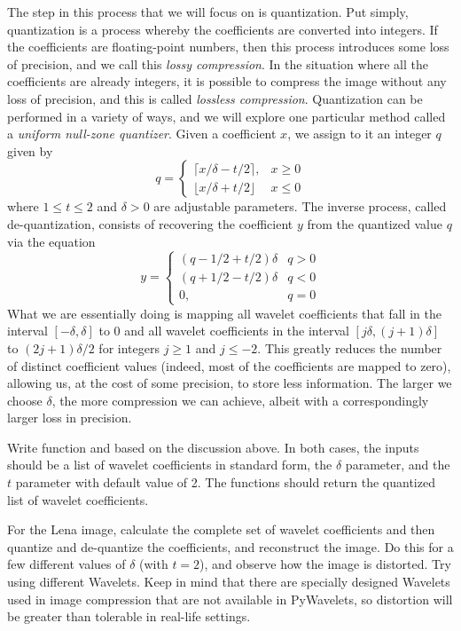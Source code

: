  The step in this process that we will focus on is quantization. Put simply,
 quantization is a process whereby the coefficients are converted into
 integers. If the coefficients are floating-point numbers, then this
 process introduces some loss of precision, and we call this \textit{
 lossy compression}. In the situation where all the coefficients are already
 integers, it is possible to compress the image without any loss of precision,
 and this is called \textit{lossless compression}. Quantization can be
 performed in a variety of ways, and we will explore one particular method
 called a \emph{uniform null-zone quantizer}. Given a coefficient $x$, we assign
 to it an integer $q$ given by
\begin{equation*}
q =
 \begin{cases}
   \lceil x / \delta - t/2 \rceil, &  x \geq 0\\
   \lfloor x / \delta + t/2 \rfloor & x \leq 0
 \end{cases}
\end{equation*}
where $1 \leq t \leq 2$ and $\delta > 0$ are adjustable parameters.
The inverse process, called de-quantization, consists of recovering
the coefficient $y$ from the quantized value $q$ via the equation
\begin{equation*}
 y =
  \begin{cases}
   (q - 1/2 + t/2)\delta & q > 0\\
   (q + 1/2 - t/2)\delta & q < 0\\
   0,                    & q = 0
  \end{cases}
 \end{equation*}
What we are essentially doing is mapping all wavelet coefficients that
fall in the interval $[-\delta,\delta]$ to 0 and all wavelet coefficients
in the interval $[j\delta,(j+1)\delta]$ to $(2j+1)\delta/2$ for integers
$j \geq 1$ and $j \leq -2$. This greatly reduces the number of distinct
coefficient values (indeed, most of the coefficients are mapped to
zero), allowing us, at the cost of some precision, to store less
information. The larger we choose $\delta$, the more compression we
can achieve, albeit with a correspondingly larger loss in precision.
\begin{problem}
Write function  and  based on the discussion above.
In both cases, the inputs should be a list of wavelet coefficients in
standard form, the $\delta$ parameter, and the $t$ parameter with default
value of 2. The functions should return the quantized list of wavelet
coefficients.

For the Lena image, calculate the complete set of wavelet coefficients and then
quantize and de-quantize the coefficients, and reconstruct the image.
Do this for a few different values of $\delta$ (with $t=2$), and observe how
the image is distorted. Try using different Wavelets. Keep in mind that there are
specially designed Wavelets used in image compression that are not available
in PyWavelets, so distortion will be greater than tolerable in real-life settings.
\end{problem}